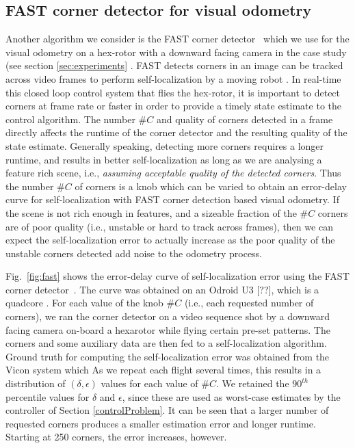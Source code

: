 \subsection{FAST corner detector for visual odometry}

Another algorithm we consider is the FAST corner detector~\cite{rosten_2006_machine} which we use for the visual odometry on a hex-rotor with a downward facing camera in the case study (see section \ref{sec:experiments} .
FAST detects corners in an image can be tracked across video frames to perform self-localization by a moving robot \cite{}. 
In real-time this closed loop control system that flies the hex-rotor, it is important to detect corners at frame rate or faster in order to provide a timely state estimate to the control algorithm.
The number $\#C$ and quality of corners detected in a frame directly affects the runtime of the corner detector and the resulting quality of the state estimate. Generally speaking, detecting more corners requires a longer runtime, and results in better self-localization as long as we are analysing a feature rich scene, i.e., \emph{assuming acceptable quality of the detected corners}. Thus the number $\#C$ of corners is a knob which can be varied to obtain an error-delay curve for self-localization with FAST corner detection based visual odometry. 
If the scene is not rich enough in features, and a sizeable fraction of the $\#C$ corners are of poor quality (i.e., unstable or hard to track across frames), then we can expect the self-localization error to actually increase as the poor quality of the unstable corners detected add noise to the odometry process. 


Fig.~\ref{fig:fast} shows the error-delay curve of self-localization error using the FAST corner detector~\cite{rosten_2006_machine}.
The curve was obtained on an Odroid U3 [??], which is a quadcore .
For each value of the knob $\#C$ (i.e., each requested number of corners), we ran the corner detector on a video sequence shot by a downward facing camera on-board a hexarotor while flying certain pre-set patterns.
The corners and some auxiliary data are then fed to a self-localization algorithm.
Ground truth for computing the self-localization error was obtained from the Vicon system which 
As we repeat each flight several times, this results in a distribution of $(\delta,\epsilon)$ values for each value of $\#C$. 
We retained the $90^{th}$ percentile values for $\delta$ and $\epsilon$, since these are used as worst-case estimates by the controller of Section \ref{controlProblem}.
It can be seen that a larger number of requested corners produces a smaller estimation error and longer runtime.
Starting at 250 corners, the error increases, however. 

